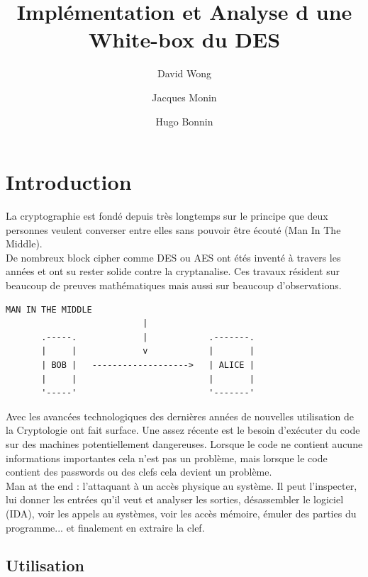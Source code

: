 \documentclass[a4paper,12pt]{article}
\author{David Wong
  \and Jacques Monin
  \and Hugo Bonnin}
\title{Implémentation et Analyse d une White-box du DES}
\begin{document}
\maketitle

\newpage

\tableofcontents

\newpage

\section{Introduction}

La cryptographie est fondé depuis très longtemps sur le principe que deux personnes veulent converser entre elles sans pouvoir être écouté (Man In The Middle).\\
De nombreux block cipher comme DES ou AES ont étés inventé à travers les années et ont su rester solide contre la cryptanalise. Ces travaux résident sur beaucoup de preuves mathématiques mais aussi sur beaucoup d'observations.

\begin{Verbatim}[samepage=true]
                   MAN IN THE MIDDLE
                           |
       .-----.             |            .-------.
       |     |             v            |       |
       | BOB |   ------------------->   | ALICE |
       |     |                          |       |
       '-----'                          '-------'
\end{Verbatim}

Avec les avancées technologiques des dernières années de nouvelles utilisation de la Cryptologie ont fait surface. Une assez récente est le besoin d'exécuter du code sur des machines potentiellement dangereuses. Lorsque le code ne contient aucune informations importantes cela n'est pas un problème, mais lorsque le code contient des passwords ou des clefs cela devient un problème.\\

Man at the end : l'attaquant à un accès physique au système. Il peut l'inspecter, lui donner les entrées qu'il veut et analyser les sorties, désassembler le logiciel (IDA), voir les appels au systèmes, voir les accès mémoire, émuler des parties du programme... et finalement en extraire la clef.\\


\subsection{Utilisation}
\end{document}
